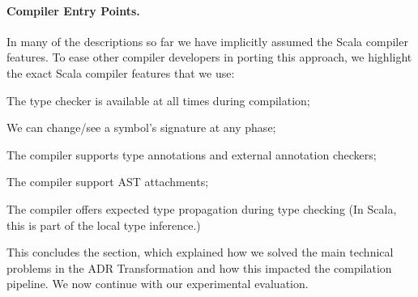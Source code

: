 
\vspace{-0.5em}
\paragraph{Compiler Entry Points.}

In many of the descriptions so far we have implicitly assumed the Scala compiler features. To ease other compiler developers in porting this approach, we highlight the exact Scala compiler features that we use:

\vspace{0.3em}
\begin{compactitem}
  \item The type checker is available at all times during compilation;
  \item We can change/see a symbol's signature at any phase;
  \item The compiler supports type annotations and external annotation checkers;
  \item The compiler support AST attachments;
  \item The compiler offers expected type propagation during type checking (In Scala, this is part of the local type inference.)
\end{compactitem}
\vspace{0.3em}

This concludes the section, which explained how we solved the main technical problems in the ADR Transformation and how this impacted the compilation pipeline. We now continue with our experimental evaluation.
